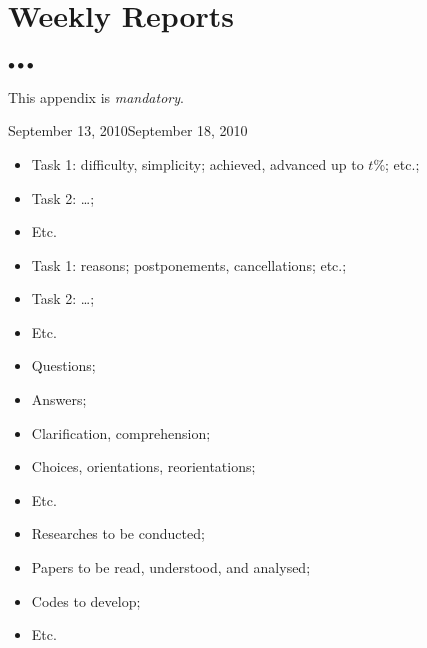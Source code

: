\documentclass[11pt, english, screen, research-development]{report-rd-info}
\newenvironment{explanation}
{\color{blue}
 \begin{list}{}{\hspace{0.2\textwidth}\color{blue}}\item $\bullet\bullet\bullet$
}
{\end{list}}
\begin{document}
\chapter{Weekly Reports}
\label{ann:WeeklyReports}

\begin{explanation}
   This appendix is \emph{mandatory}.
\end{explanation}

\begin{fichesuivi}{September 13, 2010}{September 18, 2010}

   \begin{travaileffectue}
      \begin{itemize}
         \item Task 1:  difficulty, simplicity; achieved, advanced up to $t$\%; etc.;
         \item Task 2:  \ldots;
         \item Etc.
      \end{itemize}
   \end{travaileffectue}

   \begin{travailnoneffectue}
      \begin{itemize}
         \item Task 1:  reasons; postponements, cancellations; etc.;
         \item Task 2:  \ldots;
         \item Etc.
      \end{itemize}
   \end{travailnoneffectue}

   \begin{echange}
      \begin{itemize}
         \item Questions;
         \item Answers;
         \item Clarification, comprehension;
         \item Choices, orientations, reorientations;
         \item Etc.
      \end{itemize}
   \end{echange}

   \begin{planification}
      \begin{itemize}
         \item Researches to be conducted;
         \item Papers to be read, understood, and analysed;
         \item Codes to develop;
         \item Etc.
      \end{itemize}
   \end{planification}
\end{fichesuivi}
\end{document}
